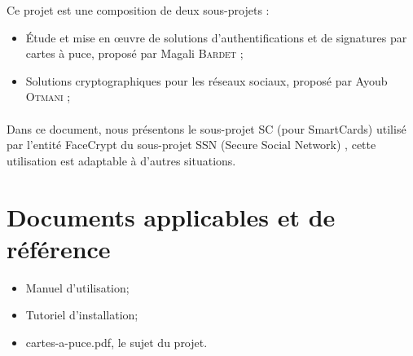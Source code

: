 \documentclass[a4paper,11pt,french]{article}
\begin{document}
Ce projet est une composition de deux sous-projets :
\begin{itemize}
    \item Étude et mise en \oe{}uvre de solutions d’authentifications et de signatures 
        par cartes à puce, proposé par Magali \textsc{Bardet} ;
\item Solutions cryptographiques pour les réseaux sociaux, proposé par Ayoub 
    \textsc{Otmani} ;
\end{itemize}

\paragraph{}
Dans ce document, nous présentons le sous-projet SC (pour SmartCards) utilisé 
par l'entité FaceCrypt du sous-projet SSN (Secure Social Network) , cette
utilisation est adaptable à d'autres situations.

\section{Documents applicables et de référence}
\begin{itemize}
    \item Manuel d'utilisation;
    \item Tutoriel d'installation;
    \item cartes-a-puce.pdf, le sujet du projet.
\end{itemize}
\end{document}
